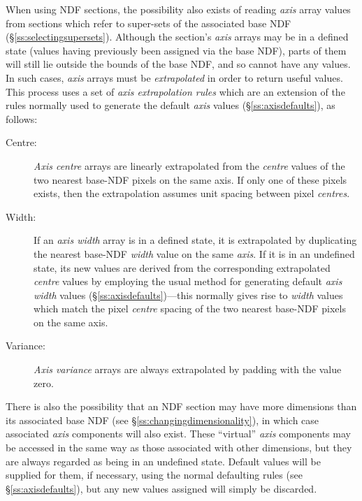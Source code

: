 \documentclass[twoside,11pt]{article}
\newcommand{\st}[1]{{\em{#1}}}
\begin{document}
When using NDF sections, the possibility also exists of reading \st{axis\/}
array values from sections which refer to super-sets of the associated base
NDF (\S\ref{ss:selectingsupersets}).
Although the section's \st{axis\/} arrays may be in a defined state (values
having previously been assigned via the base NDF), parts of them will still
lie outside the bounds of the base NDF, and so cannot have any values. 
In such cases, \st{axis\/} arrays must be \st{extrapolated\/} in order to
return useful values. 
This process uses a set of \st{axis extrapolation rules\/} which are an
extension of the rules normally used to generate the default \st{axis\/}
values (\S\ref{ss:axisdefaults}), as follows: 

\begin{description}

\item[Centre:] \st{Axis centre\/} arrays are linearly extrapolated from the
\st{centre\/} values of the two nearest base-NDF pixels on the same axis.
If only one of these pixels exists, then the extrapolation assumes unit
spacing between pixel \st{centres}. 

\item[Width:] If an \st{axis width\/} array is in a defined state, it is
extrapolated by duplicating the nearest base-NDF \st{width} value on the
same \st{axis}. 
If it is in an undefined state, its new values are derived from the
corresponding extrapolated \st{centre\/} values by employing the usual
method for generating default \st{axis width\/} values
(\S\ref{ss:axisdefaults})---this normally gives rise to \st{width\/}
values which match the pixel \st{centre\/} spacing of the two nearest
base-NDF  pixels on the same axis.

\item[Variance:] \st{Axis variance\/} arrays are always extrapolated by
padding with the value zero. 

\end{description}

There is also the possibility that an NDF section may have more dimensions
than its associated base NDF (see \S\ref{ss:changingdimensionality}), in
which case associated \st{axis\/} components will also exist. 
These ``virtual'' \st{axis\/} components may be accessed in the same way as
those associated with other dimensions, but they are always regarded as
being in an undefined state. 
Default values will be supplied for them, if necessary, using the normal
defaulting rules (see \S\ref{ss:axisdefaults}), but any new values assigned
will simply be discarded. 
\end{document}
